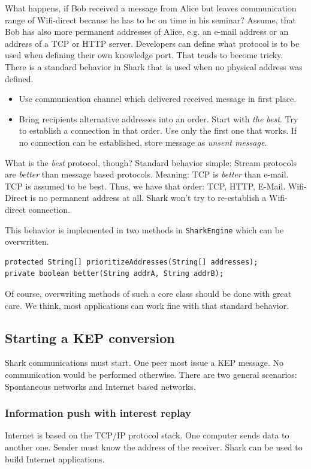What happens, if Bob received a message from Alice but leaves communication range of Wifi-direct because he has to be on time in his seminar? Assume, that Bob has also more permanent addresses of Alice, e.g. an e-mail address or an address of a TCP or HTTP server. Developers can define what protocol is to be used when defining their own knowledge port. That tends to become tricky. There is a standard behavior in Shark that is used when no physical address was defined.

\begin{itemize}
    \item Use communication channel which delivered received message in first place.
\item
Bring recipients alternative addresses into an order. Start with {\it the best}. Try to establish a connection in that order. Use only the first one that works. If no connection can be established, store message as {\it unsent message}.
\end{itemize}

What is the {\it best} protocol, though? Standard behavior simple: Stream protocols are {\it better} than message based protocols. Meaning: TCP is {\it better} than e-mail. TCP is assumed to be best. Thus, we have that order: TCP, HTTP, E-Mail. Wifi-Direct is no permanent address at all. Shark won't try to re-establish a Wifi-direct connection.

This behavior is implemented in two methods in {\tt SharkEngine} which can be overwritten.

\begin{verbatim}
protected String[] prioritizeAddresses(String[] addresses);
private boolean better(String addrA, String addrB);
\end{verbatim}

Of course, overwriting methods of such a core class should be done with great care. We think, most applications can work fine with that standard behavior.

\subsection{Starting a KEP conversion}
Shark communications must start. One peer most issue a KEP message. No communication would be performed otherwise. There are two general scenarios: Spontaneous networks and Internet based networks.

\subsubsection{Information push with interest replay}
Internet is based on the TCP/IP protocol stack. One computer sends data to another one. Sender must know the address of the receiver. Shark can be used to build Internet applications.

